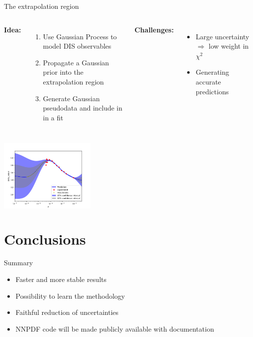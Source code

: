 \documentclass[aspectratio=169,10pt]{beamer}
\begin{document}
\begin{frame}{ The extrapolation region}
\begin{columns}
    \textbf{Idea:}
    \begin{enumerate}
        \item Use {Gaussian Process} to model {DIS observables}
        \item Propagate a Gaussian prior into the {extrapolation region}
        \item Generate {Gaussian pseudodata} and include in in a fit
    \end{enumerate}
    \textbf{Challenges:}
    \begin{itemize}
        \item Large uncertainty $\Rightarrow$ low weight in $\chi^2$
        \item Generating {accurate predictions}
    \end{itemize}
\end{columns}
        \begin{center}
            \includegraphics[width=0.35\textwidth]{feature_scaling/GP}
        \end{center}
\end{frame}


\section*{Conclusions}


\begin{frame}{Summary}
    \begin{itemize}
        \item Faster and more stable results
        \item Possibility to learn the methodology 
        \item Faithful reduction of uncertainties
        \vspace*{1em}
        \item NNPDF code will be made publicly available with documentation
    \end{itemize}
\end{frame}




\end{document}
